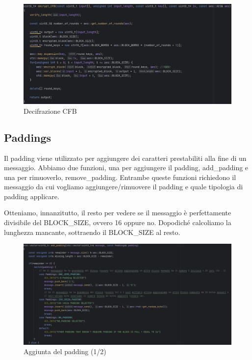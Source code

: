 \textsf{\small }

\begin{figure}[H]
	\centering
	\includegraphics[width=1\textwidth, height=1\textheight, keepaspectratio]{./images/code/cpp/modes/decrypt_CFB.PNG}
	\caption{Decifrazione CFB}
	\label{fig:decrypt_CFB}
\end{figure}

\subsection{Paddings}


\textsf{\small Il padding viene utilizzato per aggiungere dei caratteri prestabiliti alla fine di un messaggio. Abbiamo due funzioni, una per aggiungere il padding, add\_padding e una per rimuoverlo, remove\_padding. Entrambe queste funzioni richiedono il messaggio da cui vogliamo aggiungere/rimuovere il padding e quale tipologia di padding applicare.}

\textsf{\small Otteniamo, innanzitutto, il resto per vedere se il messaggio è perfettamente divisibile del BLOCK\_SIZE, ovvero 16 oppure no. Dopodiché calcoliamo la lunghezza mancante, sottraendo il BLOCK\_SIZE al resto.}

\begin{figure}[H]
	\centering
	\includegraphics[width=1\textwidth, height=1\textheight, keepaspectratio]{./images/code/cpp/padding/add_padding0.PNG}
	\caption{Aggiunta del padding (1/2)}
	\label{fig:add_padding0}
\end{figure}

